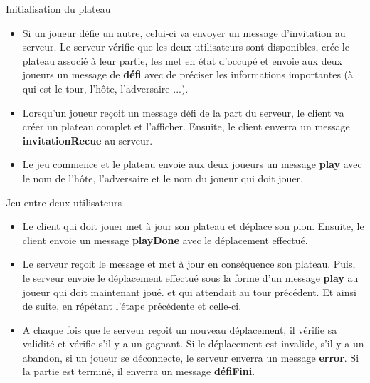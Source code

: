 \documentclass{beamer}
\begin{document}
\begin{frame}
\begin{exampleblock}{Initialisation du plateau} 
	\begin{itemize}
		[circle]
		\item Si un joueur défie un autre, celui-ci va envoyer un message d'invitation au serveur. Le serveur vérifie que les deux utilisateurs sont disponibles, crée le plateau associé à leur partie, les met en état d'occupé et envoie aux deux joueurs un message de \textbf{défi} avec de préciser les informations importantes (à qui est le tour, l'hôte, l'adversaire ...).
		\item Lorsqu'un joueur reçoit un message défi de la part du serveur, le client va créer un plateau complet et l'afficher. Ensuite, le client enverra un message \textbf{invitationRecue} au serveur.
		\item Le jeu commence et le plateau envoie aux deux joueurs un message \textbf{play} avec le nom de l'hôte, l'adversaire et le nom du joueur qui doit jouer.
	\end{itemize}
\end{exampleblock}
\end{frame}

\begin{frame}
\begin{exampleblock}{Jeu entre deux utilisateurs} 
	\begin{itemize}
		[circle]
		\item Le client qui doit jouer met à jour son plateau et déplace son pion. Ensuite, le client envoie un message \textbf{playDone} avec le déplacement effectué.
		\item Le serveur reçoit le message et met à jour en conséquence son plateau. Puis, le serveur envoie le déplacement effectué sous la forme d'un message \textbf{play} au joueur qui doit maintenant joué. et qui attendait au tour précédent. Et ainsi de suite, en répétant l'étape précédente et celle-ci.
		\item A chaque fois que le serveur reçoit un nouveau déplacement, il vérifie sa validité et vérifie s'il y a un gagnant. Si le déplacement est invalide, s'il y a un abandon, si un joueur se déconnecte, le serveur enverra un message \textbf{error}. Si la partie est terminé, il enverra un message \textbf{défiFini}.
	\end{itemize}
\end{exampleblock}
\end{frame}
\end{document}
